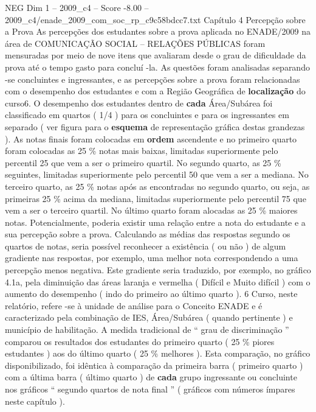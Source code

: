 \begin{textsample}{NEG Dim 1 – 2009\_c4 – Score -8.00 – 2009\_c4/enade\_2009\_com\_soc\_rp\_c9c58bdcc7.txt}  \label{ex:f1_neg_026}
Capítulo 4 Percepção sobre a Prova As percepções dos estudantes sobre a prova aplicada no ENADE/2009 na área de COMUNICAÇÃO SOCIAL – RELAÇÕES PÚBLICAS foram mensuradas por meio de nove itens que avaliaram desde o grau de dificuldade da prova até o tempo gasto para concluí -la.
As questões foram analisadas separando -se concluintes e ingressantes, e as percepções sobre a prova foram relacionadas com o desempenho dos estudantes e com a Região Geográfica de \textbf{localização} do curso6.
O desempenho dos estudantes dentro de \textbf{cada} Área/Subárea foi classificado em quartos ( 1/4 ) para os concluintes e para os ingressantes em separado ( ver figura para o \textbf{esquema} de representação gráfica destas grandezas ).
As notas finais foram colocadas em \textbf{ordem} ascendente e no primeiro quarto foram colocadas as 25 \% notas mais baixas, limitadas superiormente pelo percentil 25 que vem a ser o primeiro quartil.
No segundo quarto, as 25 \% seguintes, limitadas superiormente pelo percentil 50 que vem a ser a mediana.
No terceiro quarto, as 25 \% notas após as encontradas no segundo quarto, ou seja, as primeiras 25 \% acima da mediana, limitadas superiormente pelo percentil 75 que vem a ser o terceiro quartil.
No último quarto foram alocadas as 25 \% maiores notas.
Potencialmente, poderia existir uma relação entre a nota do estudante e a sua percepção sobre a prova.
Calculando as médias das respostas segundo os quartos de notas, seria possível reconhecer a existência ( ou não ) de algum gradiente nas respostas, por exemplo, uma melhor nota correspondendo a uma percepção menos negativa.
Este gradiente seria traduzido, por exemplo, no gráfico 4.1a, pela diminuição das áreas laranja e vermelha ( Difícil e Muito difícil ) com o aumento do desempenho ( indo do primeiro ao último quarto ). 6 Curso, neste relatório, refere -se à unidade de análise para o Conceito ENADE e é caracterizado pela combinação de IES, Área/Subárea ( quando pertinente ) e município de habilitação.
A medida tradicional de “ grau de discriminação ” comparou os resultados dos estudantes do primeiro quarto ( 25 \% piores estudantes ) aos do último quarto ( 25 \% melhores ).
Esta comparação, no gráfico disponibilizado, foi idêntica à comparação da primeira barra ( primeiro quarto ) com a última barra ( último quarto ) de \textbf{cada} grupo ingressante ou concluinte nos gráficos “ segundo quartos de nota final ” ( gráficos com números ímpares neste capítulo ).

\end{textsample}
